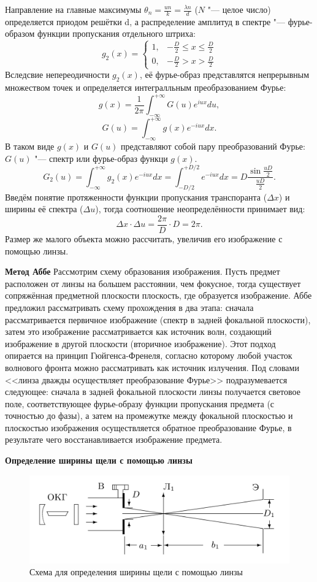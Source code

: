 \documentclass[a4paper, 12pt]{article}%
\begin{document}
Направление на главные максимумы $\theta_n = \frac{u n}{k} = \frac{\lambda n}{d}$ ($N$ "--- целое число) определяется приодом решётки d, а распределение амплитуд в спектре "--- фурье-образом функции пропускания отдельного штриха:
\[
g_2 (x) = \begin{cases} 1, & - \frac{D}{2} \leq x \leq \frac{D}{2} \\
						0, & - \frac{D}{2} > x > \frac{D}{2}
\end{cases}
\]
Вследсвие непереодичности $g_2(x)$, её фурье-образ представлятся непрерывным множеством точек и определяется интегралльным преобразованием Фурье:
\[
g(x) = \frac{1}{2 \pi} \int_{-\infty}^{+\infty} G(u) e^{iux} du,
\]
\[
G(u) = \int_{-\infty}^{+\infty} g(x) e^{-iux}dx.
\]
В таком виде $g(x)$ и $G(u)$ представляют собой пару преобразований Фурье: $G(u)$ "--- спектр или фурье-образ функци $g(x)$.
\[
	G_2 (u) = \int_{-\infty}^{+\infty} g_2 (x) e^{-iux} dx  = \int_{-D/2}^{+D/2} e^{-iux} dx = D \frac{\sin \frac{uD}{2}}{\frac{uD}{2}}.
\]
Введём понятие протяженности функции пропускания транспоранта ($\Delta x$) и ширины её спектра ($\Delta u$), тогда соотношение неопределённости принимает вид:
\[
	\Delta x \cdot \Delta u = \frac{2 \pi}{D} \cdot D = 2 \pi.
\]
Размер же малого объекта можно рассчитать, увеличив его изображение с помощью линзы.

\textbf{Метод Аббе}
Рассмотрим схему образования изображения. Пусть предмет расположен от линзы на большем расстоянии, чем фокусное, тогда существует сопряжённая предметной плоскости плоскость, где образуется изображение. Аббе предложил рассматривать схему прохождения в два этапа: сначала рассматривается первичное изображение (спектр в задней фокальной плоскости), затем это изображение рассматривается как источник волн, создающий изображение в другой плоскости (вторичное изображение). Этот подход опирается на принцип Гюйгенса-Френеля, согласно которому любой участок волнового фронта можно рассматривать как источник излучения. Под словами <<линза дважды осуществляет преобразование Фурье>> подразумевается следующее: сначала в задней фокальной плоскости линзы получается световое поле, соответствующее фурье-образу функции пропускания предмета (с точностью до фазы), а затем на промежутке между фокальной плоскостью и плоскостью изображения осуществляется обратное преобразование Фурье, в результате чего восстанавливается изображение предмета.

\textbf{Определение ширины щели с помощью линзы}
\begin{figure}[h!]
	\includegraphics[width = 1.0\linewidth]{images/1.png}
	\caption{Схема для определения ширины щели с помощью линзы}
\end{figure}
\end{document}
